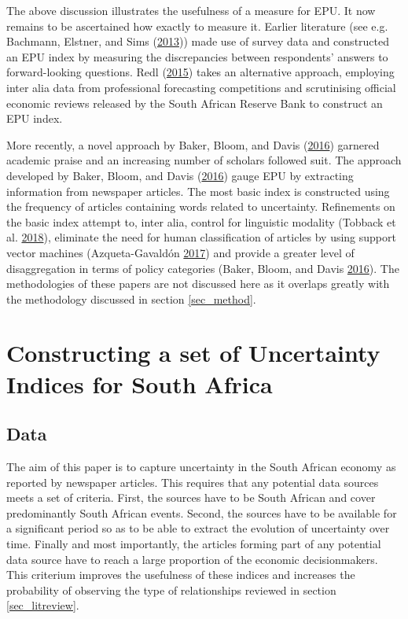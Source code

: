 \documentclass[11pt,preprint, authoryear]{elsarticle}
\numberwithin{equation}{section}
\numberwithin{figure}{section}
\numberwithin{table}{section}
\begin{document}
The above discussion illustrates the usefulness of a measure for EPU. It
now remains to be ascertained how exactly to measure it. Earlier
literature (see e.g. Bachmann, Elstner, and Sims
(\protect\hyperlink{ref-Bachmann2013}{2013})) made use of survey data
and constructed an EPU index by measuring the discrepancies between
respondents' answers to forward-looking questions. Redl
(\protect\hyperlink{ref-Redl2015}{2015}) takes an alternative approach,
employing inter alia data from professional forecasting competitions and
scrutinising official economic reviews released by the South African
Reserve Bank to construct an EPU index. %

More recently, a novel approach by Baker, Bloom, and Davis
(\protect\hyperlink{ref-Baker2016}{2016}) garnered academic praise and
an increasing number of scholars followed suit. The approach developed
by Baker, Bloom, and Davis (\protect\hyperlink{ref-Baker2016}{2016})
gauge EPU by extracting information from newspaper articles. The most
basic index is constructed using the frequency of articles containing
words related to uncertainty. Refinements on the basic index attempt to,
inter alia, control for linguistic modality (Tobback et al.
\protect\hyperlink{ref-Tobback2018}{2018}), eliminate the need for human
classification of articles by using support vector machines
(Azqueta-Gavaldón \protect\hyperlink{ref-Azqueta-Gavaldon2017}{2017})
and provide a greater level of disaggregation in terms of policy
categories (Baker, Bloom, and Davis
\protect\hyperlink{ref-Baker2016}{2016}). The methodologies of these
papers are not discussed here as it overlaps greatly with the
methodology discussed in section \ref{sec_method}.

\section{\texorpdfstring{Constructing a set of Uncertainty Indices for
South Africa
\label{sec_EPU}}{Constructing a set of Uncertainty Indices for South Africa }}\label{constructing-a-set-of-uncertainty-indices-for-south-africa}

\subsection{\texorpdfstring{Data \label{sec_data}}{Data }}\label{data}

The aim of this paper is to capture uncertainty in the South African
economy as reported by newspaper articles. This requires that any potential data sources meets
a set of criteria. First, the sources have to be South African and cover
predominantly South African events. Second, the sources have to be
available for a significant period so as to be able to extract the
evolution of uncertainty over time. Finally and most importantly, the
articles forming part of any potential data source have to reach a large
proportion of the economic decisionmakers. This criterium improves the usefulness of these indices and increases the probability of observing the type of relationships reviewed in section
\ref{sec_litreview}.
\end{document}
